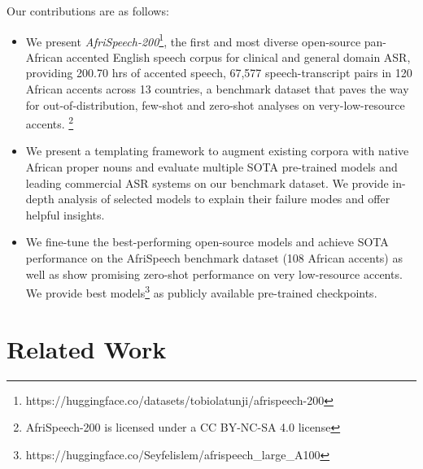 \documentclass[11pt,a4paper]{article}
\begin{document}
Our contributions are as follows: 
\begin{itemize}%
\item We present \textit{AfriSpeech-200}\footnote{https://huggingface.co/datasets/tobiolatunji/afrispeech-200}, the first and most diverse open-source pan-African accented English speech corpus for clinical and general domain ASR, providing 200.70 hrs of accented speech, 67,577 speech-transcript pairs in 120 African accents across 13 countries, a benchmark dataset that paves the way for out-of-distribution, few-shot and zero-shot analyses on very-low-resource accents. \footnote{AfriSpeech-200 is licensed under a CC BY-NC-SA 4.0 license}


\item We present a templating framework to augment existing corpora with native African proper nouns and evaluate multiple SOTA pre-trained models and leading commercial ASR systems on our benchmark dataset. We provide in-depth analysis of selected models to explain their failure modes and offer helpful insights.

\item We fine-tune the best-performing open-source models and achieve SOTA performance on the AfriSpeech benchmark dataset (108 African accents) as well as show promising zero-shot performance on very low-resource accents. We provide best models\footnote{https://huggingface.co/Seyfelislem/afrispeech\_large\_A100} as publicly available pre-trained checkpoints.

\end{itemize}

\section{Related Work}

\end{document}
